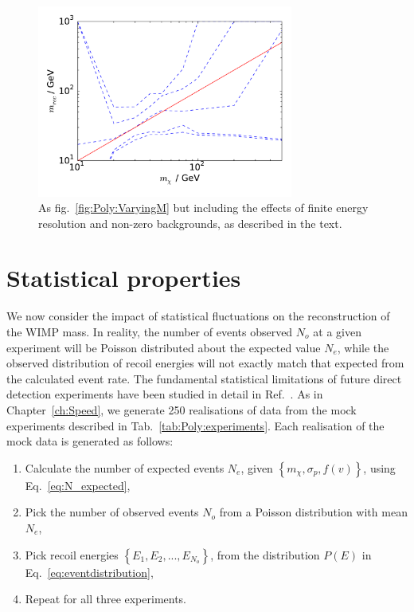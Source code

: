 \begin{figure}[t]
\centering
  \includegraphics[width=0.75\textwidth]{Poly/VaryingM_real.pdf}
  \caption[Reconstructed WIMP mass as a function of input WIMP mass for experiments including the effects of finite backgrounds and energy resolution]{As fig.~\ref{fig:Poly:VaryingM} but including the effects of finite energy resolution and non-zero backgrounds, as described in the text.}
  \label{fig:Poly:VaryingM_real}
\end{figure}

\section{Statistical properties}
\label{sec:Poly:stats}


We now consider the impact of statistical fluctuations on the reconstruction of the WIMP mass. In reality, the number of events observed $N_o$ at a given experiment will be Poisson distributed about the expected value $N_e$, while the observed distribution of recoil energies will not exactly match that expected from the calculated event rate. The fundamental statistical limitations of future direct detection experiments have been studied in detail in Ref.~\cite{Strege:2012}. As in Chapter~\ref{ch:Speed}, we generate 250 realisations of data from the mock experiments described in Tab.~\ref{tab:Poly:experiments}. Each realisation of the mock data is generated as follows: 

\begin{enumerate}
\item Calculate the number of expected events $N_e$, given $\left\{m_\chi, \sigma_p, f(v)\right\}$, using Eq.~\ref{eq:N_expected},
\item Pick the number of observed events $N_o$ from a Poisson distribution with mean $N_e$,
\item Pick recoil energies $\left\{E_1, E_2, ..., E_{N_o}\right\}$, from the distribution $P(E)$ in Eq.~\ref{eq:eventdistribution},
\item Repeat for all three experiments.
\end{enumerate}

